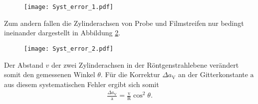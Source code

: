  \begin{figure}
   \centering
   \texttt{[image: Syst\_error\_1.pdf]}
   \caption{  }
   \label{fig:error1}
  \end{figure}

Zum andern fallen die Zylinderachsen von Probe und Filmstreifen
nur bedingt ineinander dargestellt in Abbildung \ref{fig:error2}.

\begin{figure}
  \centering
  \texttt{[image: Syst\_error\_2.pdf]}
  \caption{  }
  \label{fig:error2}
\end{figure}
Der Abstand $v$ der zwei Zylinderachsen in der Röntgenstrahlebene
verändert somit den gemessenen Winkel $\theta$.
Für die Korrektur $\Delta a_\mathrm{V}$ an der Gitterkonstante $\mathrm{a}$
aus diesem systematischen Fehler ergibt sich somit
\begin{align}
  \frac{\Delta a_\mathrm{V}}{\mathrm{a}}=\frac{\mathrm{v}}{\mathrm{R}} \cos^2 \theta.
\end{align}
